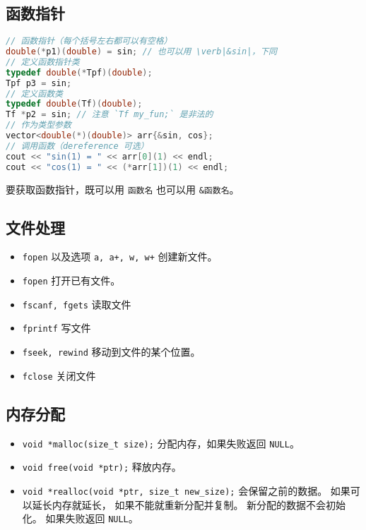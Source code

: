 \subsection{函数指针}
\begin{lstlisting}[language=cpp]
// 函数指针（每个括号左右都可以有空格）
double(*p1)(double) = sin; // 也可以用 \verb|&sin|，下同
// 定义函数指针类
typedef double(*Tpf)(double);
Tpf p3 = sin;
// 定义函数类
typedef double(Tf)(double);
Tf *p2 = sin; // 注意 `Tf my_fun;` 是非法的
// 作为类型参数
vector<double(*)(double)> arr{&sin, cos};
// 调用函数（dereference 可选）
cout << "sin(1) = " << arr[0](1) << endl;
cout << "cos(1) = " << (*arr[1])(1) << endl;
\end{lstlisting}

要获取函数指针，既可以用 \verb|函数名| 也可以用 \verb|&函数名|。

\subsection{文件处理}
\begin{itemize}
\item \verb|fopen| 以及选项 \verb|a, a+, w, w+| 创建新文件。
\item \verb|fopen| 打开已有文件。
\item \verb|fscanf, fgets| 读取文件
\item \verb|fprintf| 写文件
\item \verb|fseek, rewind| 移动到文件的某个位置。
\item \verb|fclose| 关闭文件
\end{itemize}

\subsection{内存分配}
\begin{itemize}
\item \verb|void *malloc(size_t size);| 分配内存，如果失败返回 \verb|NULL|。
\item \verb|void free(void *ptr);| 释放内存。
\item \verb|void *realloc(void *ptr, size_t new_size);| 会保留之前的数据。 如果可以延长内存就延长， 如果不能就重新分配并复制。 新分配的数据不会初始化。 如果失败返回 \verb|NULL|。
\end{itemize}
